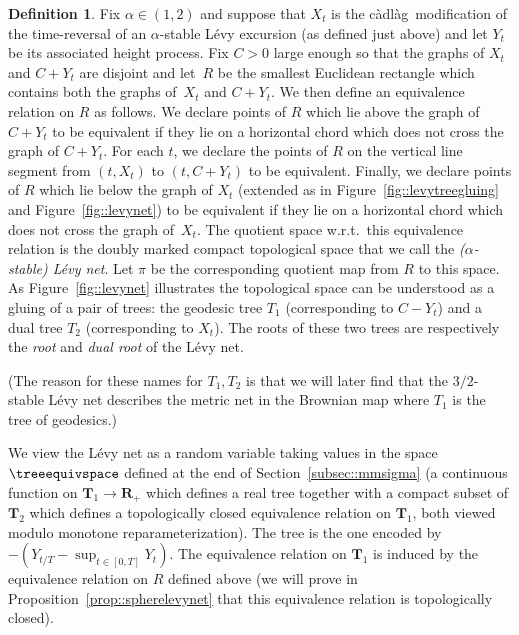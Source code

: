 \documentclass[JEP,XML,SOM,Unicode]{cedram}
\theoremstyle{plain}
\numberwithin{theorem}{section}
\theoremstyle{definition}
\newtheorem{definition}[theorem]{Definition}
\newcommand{\R}{\mathbf{R}}
\newcommand{\T}{\mathbf{T}}
\newcommand{\cadlag}{càdlàg}
\begin{document}
\begin{definition}
\label{def::levynet}
Fix $\alpha \in (1,2)$ and suppose that $X_t$ is the \cadlag\ modification of the time-reversal of an $\alpha$-stable Lévy excursion (as defined just above) and let $Y_t$ be its associated height process. Fix $C > 0$ large enough so that the graphs of $X_t$ and $C+Y_t$ are disjoint and let~$R$ be the smallest Euclidean rectangle which contains both the graphs of~$X_t$ and $C+Y_t$. We then define an equivalence relation on $R$ as follows. We declare points of $R$ which lie above the graph of $C+Y_t$ to be equivalent if they lie on a horizontal chord which does not cross the graph of $C+Y_t$. For each $t$, we declare the points of $R$ on the vertical line segment from $(t,X_t)$ to $(t,C+Y_t)$ to be equivalent. Finally, we declare points of $R$ which lie below the graph of $X_t$ (extended as in Figure~\ref{fig::levytreegluing} and Figure~\ref{fig::levynet}) to be equivalent if they lie on a horizontal chord which does not cross the graph of~$X_t$. The quotient space w.r.t.\ this equivalence relation is the doubly marked compact topological space that we call the \emph{($\alpha$-stable) Lévy net}. Let $\pi$ be the corresponding quotient map from $R$ to this space. As Figure~\ref{fig::levynet} illustrates the topological space can be understood as a gluing of a pair of trees: the geodesic tree $T_1$ (corresponding to $C-Y_t$) and a dual tree $T_2$ (corresponding to $X_t$). The roots of these two trees are respectively the \emph{root} and \emph{dual root} of the Lévy net.

(The reason for these names for $T_1,T_2$ is that we will later find that the $3/2$-stable Lévy net describes the metric net in the Brownian map where $T_1$ is the tree of geodesics.)

We view the Lévy net as a random variable taking values in the space $\treeequivspace$ defined at the end of Section~\ref{subsec::mmsigma} (\ie a continuous function on $\T_1 \to \R_+$ which defines a real tree together with a compact subset of $\T_2$ which defines a topologically closed equivalence relation on $\T_1$, both viewed modulo monotone reparameterization). The tree is the one encoded by $-(Y_{t/T} - \sup_{t \in [0,T]} Y_t)$. The equivalence relation on $\T_1$ is induced by the equivalence relation on $R$ defined above (we will prove in Proposition~\ref{prop::spherelevynet} that this equivalence relation is topologically closed).


\end{definition}
\end{document}
